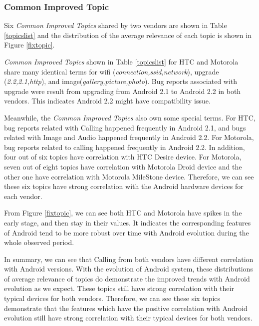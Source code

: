 \documentclass[10pt, conference, compsocconf]{IEEEtran}
\begin{document}
\subsubsection{Common Improved Topic}

Six \textit{Common Improved Topics} shared by two vendors are shown in Table \ref{topicslist} and the distribution of the average relevance of each topic is shown in Figure \ref{fixtopic}.

\textit{Common Improved Topics} shown in Table \ref{topicslist} for HTC and Motorola share many identical terms for wifi (\textit{connection,ssid,network}), upgrade (\textit{2.2,2.1,http}), and image(\textit{gallery,picture,photo}). Bug reports associated with upgrade were result from upgrading from Android 2.1 to Android 2.2 in both vendors. This indicates Android 2.2 might have compatibility issue. 

Meanwhile, the \textit{Common Improved Topics} also own some special terms. For HTC, bug reports related with Calling happened frequently in Android 2.1, and bugs related with Image and Audio happened frequently in Android 2.2. For Motorola, bug reports related to calling happened frequently in Android 2.2. In addition, four out of six topics have correlation with HTC Desire device. For Motorola, seven out of eight topics have correlation with Motorola Droid device and the other one have correlation with Motorola MileStone device. Therefore, we can see these six topics have strong correlation with the Android hardware devices for each vendor.

From Figure \ref{fixtopic}, we can see both HTC and Motorola have spikes in the early stage, and then stay in their values. It indicates the corresponding features of Android tend to be more robust over time with Android evolution during the whole observed period.

In summary, we can see that Calling from both vendors have different correlation with Android versions. With the evolution of Android system, these distributions of average relevance of topics do demonstrate the improved trends with Android evolution as we expect. These topics still have strong correlation with their typical devices for both vendors. Therefore, we can see these six topics demonstrate that the features which have the positive correlation with Android evolution still have strong correlation with their typical devices for both vendors.

\end{document}
